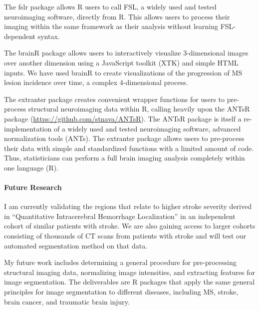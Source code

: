 \documentclass[12pt,a4paper]{article}
\begin{document}
The fslr package allows R users to call FSL, a widely used and tested neuroimaging software, directly from R.  This allows users to process their imaging within the same framework as their analysis without learning FSL-dependent syntax.  

The brainR package allows users to interactively visualize 3-dimensional images over another dimension using a JavaScript toolkit (XTK) and simple HTML inputs.  We have used brainR to create visualizations of the progression of MS lesion incidence over time, a complex 4-dimensional process.   

The extrantsr package creates convenient wrapper functions for users to pre-process structural neuroimaging data within R, calling heavily upon the ANTsR package (\url{https://github.com/stnava/ANTsR}).  The ANTsR package is itself a re-implementation of a widely used and tested neuroimaging software, advanced normalization tools (ANTs).  The extrantsr package allows users to pre-process their data with simple and standardized functions with a limited amount of code.  Thus, statisticians can perform a full brain imaging analysis completely within one language (R).  

\paragraph{Future Research} I am currently validating the regions that relate to higher stroke severity derived in ``Quantitative Intracerebral Hemorrhage Localization'' in an independent cohort of similar patients with stroke.  We are also gaining access to larger cohorts consisting of thousands of CT scans from patients with stroke and will test our automated segmentation method on that data. 

My future work includes determining a general procedure for pre-processing structural imaging data, normalizing image intensities, and extracting features for image segmentation. The deliverables are R packages that apply the same general principles for image segmentation to different diseases, including MS, stroke, brain cancer, and traumatic brain injury.  
\end{document}
